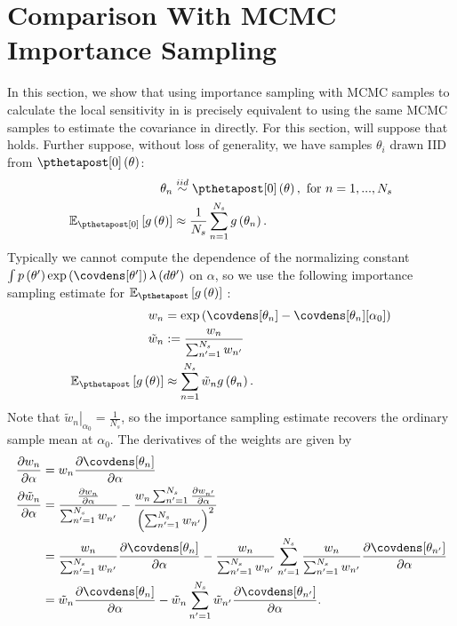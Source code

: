 \documentclass{article}\usepackage[]{graphicx}\usepackage[]{color}
\theoremstyle{definition}
\theoremstyle{plain}
\theoremstyle{plain}
\theoremstyle{plain}
\theoremstyle{definition}
\theoremstyle{plain}
\theoremstyle{plain}
\begin{document}
\section{Comparison With MCMC Importance Sampling\label{app:mcmc_importance_sampling}}

In this section, we show that using importance sampling with MCMC
samples to calculate the local sensitivity in 
is precisely equivalent to using the same MCMC samples to estimate
the covariance in  directly.
For this section, will suppose that 
holds. Further suppose, without loss of generality, we have samples
$\theta_{i}$ drawn IID from $\pzeropost\left(\theta\right)$:
\begin{align*}
\theta_{n} & \iid\pzeropost\left(\theta\right),\textrm{ for }n=1,...,N_s\\
\mbe_{\pzeropost}\left[g\left(\theta\right)\right] & \approx\frac{1}{N_s}\sum_{n=1}^{N_s}g\left(\theta_{n}\right).
\end{align*}
Typically we cannot compute the dependence of the normalizing constant
$\int p\left(\theta'\right)\exp\left(\covdens[\theta']\right)\lambda\left(d\theta'\right)$
on $\alpha$, so we use the following importance sampling estimate
for $\mbe_{\pthetapost}\left[g\left(\theta\right)\right]$ \citep[Chapter 9]{owen:2013:mcmcbook}:
\begin{align*}
w_{n} & =\exp\left(\covdens[\theta_{n}]-\covdens[\theta_{n}][\alpha_{0}]\right)\\
\tilde{w}_{n} & :=\frac{w_{n}}{\sum_{n'=1}^{N_s}w_{n'}}\\
\mbe_{\pthetapost}\left[g\left(\theta\right)\right] & \approx\sum_{n=1}^{N_s}\tilde{w}_{n}g\left(\theta_{n}\right).
\end{align*}
Note that $\left.\tilde{w}_{n}\right|_{\alpha_{0}}=\frac{1}{N_s}$,
so the importance sampling estimate recovers the ordinary sample mean
at $\alpha_{0}$. The derivatives of the weights are given by
\begin{align*}
\frac{\partial w_{n}}{\partial\alpha} & =
    w_{n}\frac{\partial\covdens[\theta_{n}]}{\partial\alpha}\\
\frac{\partial\tilde{w}_{n}}{\partial\alpha} & =
    \frac{\frac{\partial w_{n}}{\partial\alpha}}{\sum_{n'=1}^{N_s}w_{n'}}-
    \frac{w_{n}\sum_{n'=1}^{N_s}\frac{\partial w_{n'}}{\partial\alpha}}
    {\left(\sum_{n'=1}^{N_s}w_{n'}\right)^{2}}\\
 & =\frac{w_{n}}{\sum_{n'=1}^{N_s}w_{n'}}
    \frac{\partial\covdens[\theta_{n}]}{\partial\alpha} -
    \frac{w_{n}}{\sum_{n'=1}^{N_s}w_{n'}}\sum_{n'=1}^{N_s}
    \frac{w_{n}}{\sum_{n'=1}^{N_s}w_{n'}}
    \frac{\partial\covdens[\theta_{n'}]}{\partial\alpha}\\
 & =\tilde{w}_{n}\frac{\partial\covdens[\theta_{n}]}{\partial\alpha}-
    \tilde{w}_{n}\sum_{n'=1}^{N_s}\tilde{w}_{n'}
    \frac{\partial\covdens[\theta_{n'}]}{\partial\alpha}.
\end{align*}
\end{document}
